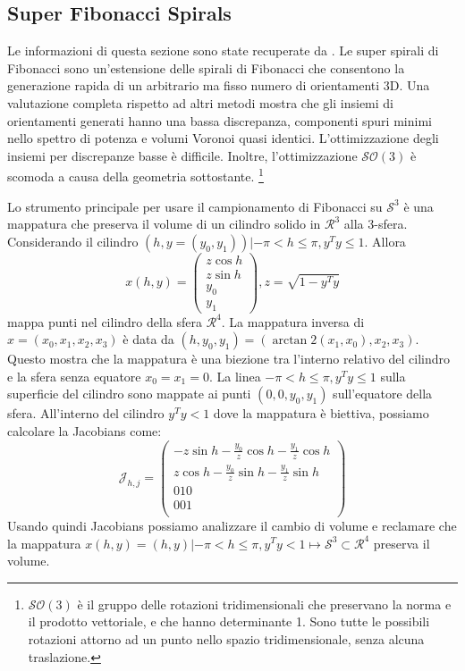 \subsection{Super Fibonacci Spirals}\label{subsec:superfibonaccispiral}
Le informazioni di questa sezione sono state recuperate da \cite{Alexa_2022_CVPR}.
Le super spirali di Fibonacci sono un'estensione delle spirali di Fibonacci che consentono la generazione rapida di un arbitrario ma fisso numero di orientamenti 3D. Una valutazione completa rispetto ad altri metodi mostra che gli insiemi di orientamenti generati hanno una bassa discrepanza, componenti spuri minimi nello spettro di potenza e volumi Voronoi quasi identici. 
L'ottimizzazione degli insiemi per discrepanze basse è difficile. Inoltre, l'ottimizzazione $\mathcal{SO}(3)$ è scomoda a causa della geometria sottostante. \footnote{$\mathcal{SO}(3)$ è il gruppo delle rotazioni tridimensionali che preservano la norma e il prodotto vettoriale, e che hanno determinante 1. Sono tutte le possibili rotazioni attorno ad un punto nello spazio tridimensionale, senza alcuna traslazione.}

Lo strumento principale per usare il campionamento di Fibonacci su $\mathcal{S}^3$ è una mappatura che preserva il volume di un cilindro solido in $\mathcal{R}^3$ alla 3-sfera. Considerando il cilindro ${(h, y = (y_0, y_1))| -\pi < h \le \pi, y^Ty \le 1}$. Allora 
$$
	x(h, y) = \begin{pmatrix}
				z \cos{h} \\
				z \sin{h} \\
				y_0 \\
				y_1  
			  \end{pmatrix}, z = \sqrt{1 - y^Ty}
$$
mappa punti nel cilindro della sfera $\mathcal{R}^4$. La mappatura inversa di $x = (x_0, x_1, x_2, x_3)$ è data da $(h, y_0, y_1) = (\arctan2(x_1,x_0),x_2,x_3)$. Questo mostra che la mappatura è una biezione tra l'interno relativo del cilindro e la sfera senza equatore $x_0 = x_1 = 0$. La linea ${-\pi < h \le \pi, y^Ty \le 1}$ sulla superficie del cilindro sono mappate ai punti $(0, 0, y_0, y_1)$ sull'equatore della sfera. All'interno del cilindro $y^Ty < 1$ dove la mappatura è biettiva, possiamo calcolare la Jacobians come: 
$$
	\mathcal{J}_{h, j} = \begin{pmatrix}
		-z\sin{h} -\frac{y_0}{z}\cos{h} -\frac{y_1}{z}\cos{h} \\
		z\cos{h} -\frac{y_0}{z}\sin{h} -\frac{y_1}{z}\sin{h} \\
		0 1 0 \\
		0 0 1 \\
	\end{pmatrix}
$$
Usando quindi Jacobians possiamo analizzare il cambio di volume e reclamare che la mappatura $x(h, y) = {(h, y)| -\pi < h \le \pi, y^Ty < 1} \mapsto \mathcal{S}^3 \subset \mathcal{R}^4$ preserva il volume. 

